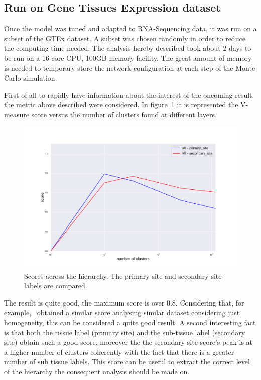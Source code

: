 \subsection{Run on Gene Tissues Expression dataset}
Once the model was tuned and adapted to RNA-Sequencing data, it was run on a subset of the GTEx dataset. A subset was chosen randomly in order to reduce the computing time needed. The analysis hereby described took about 2 days to be run on a 16 core CPU, 100GB memory facility. The great amount of memory is needed to temporary store the network configuration at each step of the Monte Carlo simulation.

First of all to rapidly have information about the interest of the oncoming result the metric above described were considered. In figure~\ref{fig:topic/gtex/oversigma_10tissue/metric_scores} it is represented the V-measure score versus the number of clusters found at different layers.
\begin{figure}[htb!]
    \centering
    \includegraphics[width=0.9\linewidth]{pictures/topic/gtex/oversigma_10tissue/metric_scores.pdf}
    \caption{Scores across the hierarchy. The primary site and secondary site labels are compared.}
    \label{fig:topic/gtex/oversigma_10tissue/metric_scores}
\end{figure}
The result is quite good, the maximum score is over $0.8$. Considering that, for example,~\cite{Farver2018} obtained a similar score analysing similar dataset considering just homogeneity, this can be considered a quite good result. A second interesting fact is that both the tissue label (primary site) and the sub-tissue label (secondary site) obtain such a good score, moreover the the secondary site score's peak is at a higher number of clusters coherently with the fact that there is a greater number of sub tissue labels.
This score can be useful to extract the correct level of the hierarchy the consequent analysis should be made on.

